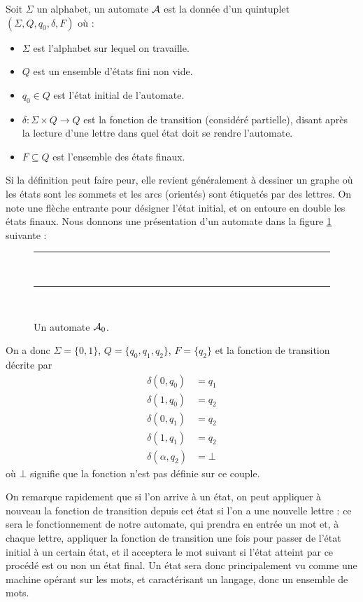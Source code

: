 \begin{defi}
    Soit $\Sigma$ un alphabet, un automate $\mathcal A$ est la donnée d'un quintuplet $(\Sigma,Q,q_0,\delta,F)$ où :
    \begin{itemize}[label=$\bullet$]
        \item $\Sigma$ est l'alphabet sur lequel on travaille.
        \item $Q$ est un ensemble d'états fini non vide.
        \item $q_0 \in Q$ est l'état initial de l'automate.
        \item $\delta : \Sigma \times Q \to Q$ est la fonction de transition (considéré partielle), disant après la lecture d'une lettre dans quel état doit se rendre l'automate.
        \item $F\subseteq Q$ est l'ensemble des états finaux.
    \end{itemize}
\end{defi}

Si la définition peut faire peur, elle revient généralement à dessiner un graphe où les états sont les sommets et les arcs (orientés) sont étiquetés par des lettres. On note une flèche entrante pour désigner l'état initial, et on entoure en double les états finaux. Nous donnons une présentation d'un automate dans la figure \ref{fig:automate1} suivante :

\begin{figure}[h]
    \centering
    \rule{17cm}{0.5pt}\\
    \vspace{0.5cm}
    
    \rule{17cm}{0.5pt}\\
    \vspace{0.5cm}
    \caption{Un automate $\mathcal A_0$.}
    \label{fig:automate1}
\end{figure}

On a donc $\Sigma = \{0,1\}$, $Q=\{q_0,q_1,q_2\}$, $F=\{q_2\}$ et la fonction de transition décrite par \begin{align*}
    \delta (0,q_0) &= q_1\\
    \delta (1,q_0) &= q_2\\
    \delta (0,q_1) &= q_2\\
    \delta (1,q_1) &= q_2\\
    \delta (\alpha,q_2) &= \bot
\end{align*}
 où $\bot$ signifie que la fonction n'est pas définie sur ce couple.

 On remarque rapidement que si l'on arrive à un état, on peut appliquer à nouveau la fonction de transition depuis cet état si l'on a une nouvelle lettre : ce sera le fonctionnement de notre automate, qui prendra en entrée un mot et, à chaque lettre, appliquer la fonction de transition une fois pour passer de l'état initial à un certain état, et il acceptera le mot suivant si l'état atteint par ce procédé est ou non un état final. Un état sera donc principalement vu comme une machine opérant sur les mots, et caractérisant un langage, donc un ensemble de mots.

